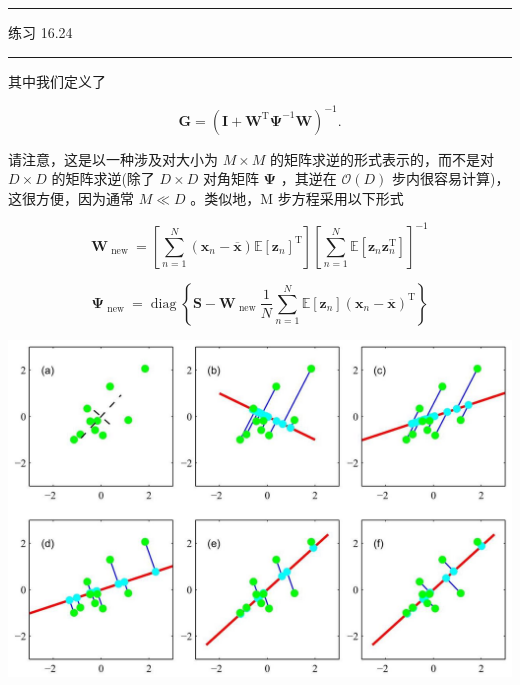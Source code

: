 \documentclass[10pt]{report}
\newcommand{\HRule}{\begin{center}\rule{0.9\linewidth}{0.2mm}\end{center}}
\begin{document}
\HRule

练习 16.24

\HRule

其中我们定义了

\[
\mathbf{G} = {\left( \mathbf{I} + {\mathbf{W}}^{\mathrm{T}}{\mathbf{\Psi }}^{-1}\mathbf{W}\right) }^{-1}. \tag{16.74}
\]

请注意，这是以一种涉及对大小为 \(M \times  M\) 的矩阵求逆的形式表示的，而不是对 \(D \times  D\) 的矩阵求逆(除了 \(D \times  D\) 对角矩阵 \(\mathbf{\Psi }\) ，其逆在 \(\mathcal{O}\left( D\right)\) 步内很容易计算)，这很方便，因为通常 \(M \ll  D\) 。类似地，M 步方程采用以下形式

\[
{\mathbf{W}}_{\text{ new }} = \left\lbrack  {\mathop{\sum }\limits_{{n = 1}}^{N}\left( {{\mathbf{x}}_{n} - \overline{\mathbf{x}}}\right) \mathbb{E}{\left\lbrack  {\mathbf{z}}_{n}\right\rbrack  }^{\mathrm{T}}}\right\rbrack  {\left\lbrack  \mathop{\sum }\limits_{{n = 1}}^{N}\mathbb{E}\left\lbrack  {\mathbf{z}}_{n}{\mathbf{z}}_{n}^{\mathrm{T}}\right\rbrack  \right\rbrack  }^{-1} \tag{16.75}
\]

\[
{\mathbf{\Psi }}_{\text{ new }} = \operatorname{diag}\left\{  {\mathbf{S} - {\mathbf{W}}_{\text{ new }}\frac{1}{N}\mathop{\sum }\limits_{{n = 1}}^{N}\mathbb{E}\left\lbrack  {\mathbf{z}}_{n}\right\rbrack  {\left( {\mathbf{x}}_{n} - \overline{\mathbf{x}}\right) }^{\mathrm{T}}}\right\}   \tag{16.76}
\]

\begin{center}
\includegraphics[max width=1.0\textwidth]{images/0194e279-9b28-703a-88f4-c3ac21e2010d_540_247_351_1304_872_0.jpg}
\end{center}
\hspace*{3em} 
\end{document}
